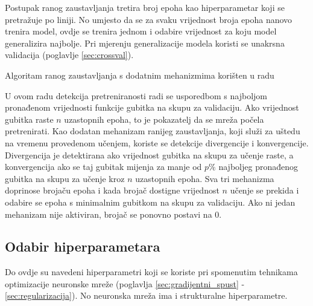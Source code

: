 \documentclass[times, utf8, numeric, diplomski]{fer}
\def\secref#1{(poglavlje \ref{#1})}
\begin{document}
Postupak ranog zaustavljanja tretira broj epoha kao hiperparametar koji se pretražuje po liniji. No umjesto da se za svaku vrijednost broja epoha nanovo trenira model, ovdje se trenira jednom i odabire vrijednost za koju model generalizira najbolje. Pri mjerenju generalizacije modela koristi se unakrsna validacija \secref{sec:crossval}.
\newline
\newline
\begin{algorithm}[H]
\DontPrintSemicolon
{}
\;
\caption{Algoritam ranog zaustavljanja s dodatnim mehanizmima korišten u radu}
\label{alg:nested_cv}
\end{algorithm}

U ovom radu detekcija pretreniranosti radi se usporedbom s najboljom pronađenom vrijednosti funkcije gubitka na skupu za validaciju. Ako vrijednost gubitka raste $n$ uzastopnih epoha, to je pokazatelj da se mreža počela pretrenirati. Kao dodatan mehanizam ranijeg zaustavljanja, koji služi za uštedu na vremenu provedenom učenjem, koriste se detekcije divergencije i konvergencije. Divergencija je detektirana ako vrijednost gubitka na skupu za učenje raste, a konvergencija ako se taj gubitak mijenja za manje od $p\%$ najboljeg pronađenog gubitka na skupu za učenje kroz $n$ uzastopnih epoha. Sva tri mehanizma doprinose brojaču epoha i kada brojač dostigne vrijednost $n$ učenje se prekida i odabire se epoha s minimalnim gubitkom na skupu za validaciju. Ako ni jedan mehanizam nije aktiviran, brojač se ponovno postavi na $0$.

\subsection{Odabir hiperparametara}
Do ovdje su navedeni hiperparametri koji se koriste pri spomenutim tehnikama optimizacije neuronske mreže (poglavlja \ref{sec:gradijentni_spust} - \ref{sec:regularizacija}). No neuronska mreža ima i strukturalne hiperparametre.
\end{document}
